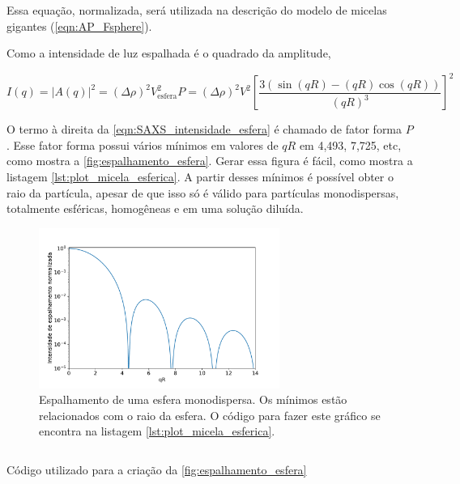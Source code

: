 		Essa equação, normalizada, será utilizada na descrição do modelo de micelas gigantes (\autoref{eqn:AP_Fsphere}).
		
		Como a intensidade de luz espalhada é o quadrado da amplitude, \cite{Narayanan2008a}
		
		\begin{equation}
			I(q) = |A(q)|^2 = (\Delta \rho)^2 V_\mathrm{esfera}^2 P=(\Delta \rho)^2 V^2 \left[ \dfrac{3 \left( \sin (qR) - (qR) \cos (qR) \right)}{\left( qR \right) ^3} \right]^2
			\label{eqn:SAXS_intensidade_esfera}
		\end{equation}
		
		O termo à direita da \autoref{eqn:SAXS_intensidade_esfera} é chamado de fator forma \(P\).  Esse fator forma possui vários mínimos em valores de \(qR\) em 4,493, 7,725, etc, como mostra a \autoref{fig:espalhamento_esfera}. Gerar essa figura é fácil, como mostra a listagem \ref{lst:plot_micela_esferica}. A partir desses mínimos é possível obter o raio da partícula, apesar de que isso só é válido para partículas monodispersas, totalmente esféricas, homogêneas e em uma solução diluída. \cite{Pedersen_Aula1, Narayanan2008a}
		
		\begin{figure}[h]
			\centering
			\includegraphics[width=0.7\textwidth]{imagens/saxs/espalhamento_esfera_monodispersa}
			\caption{Espalhamento de uma esfera monodispersa. Os mínimos estão relacionados com o raio da esfera. O código para fazer este gráfico se encontra na listagem \ref{lst:plot_micela_esferica}.}
			\label{fig:espalhamento_esfera}
		\end{figure}
		
		\begin{listing}[h]
			\inputminted{python}{./python/plot_saxs_esfera.py}
			\caption{Código utilizado para a criação da \autoref{fig:espalhamento_esfera}}
			\label{lst:plot_micela_esferica}
		\end{listing}
		
